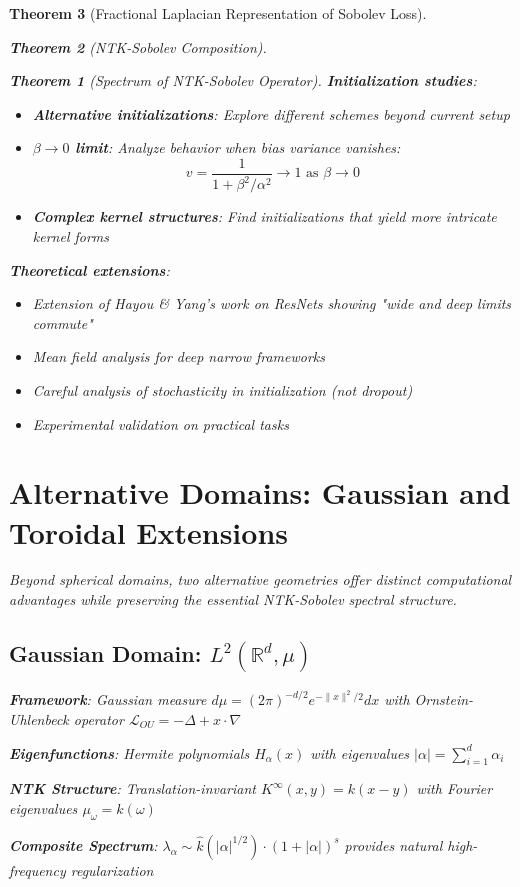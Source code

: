 \documentclass{article}
\newtheorem{theorem}{Theorem}[section]
\begin{document}
\begin{theorem}[Fractional Laplacian Representation of Sobolev Loss]
\begin{theorem}[NTK-Sobolev Composition]
\begin{theorem}[Spectrum of NTK-Sobolev Operator]
\textbf{Initialization studies}:
\begin{itemize}
\item \textbf{Alternative initializations}: Explore different schemes beyond current setup
\item \textbf{$\beta \to 0$ limit}: Analyze behavior when bias variance vanishes:
  \[ v = \frac{1}{1 + \beta^2/\alpha^2} \to 1 \text{ as } \beta \to 0 \]
\item \textbf{Complex kernel structures}: Find initializations that yield more intricate kernel forms
\end{itemize}

\textbf{Theoretical extensions}:
\begin{itemize}
\item Extension of Hayou \& Yang's work on ResNets showing "wide and deep limits commute"
\item Mean field analysis for deep narrow frameworks
\item Careful analysis of stochasticity in initialization (not dropout)
\item Experimental validation on practical tasks
\end{itemize}

\section{Alternative Domains: Gaussian and Toroidal Extensions}

Beyond spherical domains, two alternative geometries offer distinct computational advantages while preserving the essential NTK-Sobolev spectral structure.

\subsection{Gaussian Domain: $L^2(\mathbb{R}^d, \mu)$}

\textbf{Framework}: Gaussian measure $d\mu = (2\pi)^{-d/2} e^{-\|x\|^2/2} dx$ with Ornstein-Uhlenbeck operator $\mathcal{L}_{OU} = -\Delta + x \cdot \nabla$

\textbf{Eigenfunctions}: Hermite polynomials $H_{\alpha}(x)$ with eigenvalues $|\alpha| = \sum_{i=1}^d \alpha_i$

\textbf{NTK Structure}: Translation-invariant $K^{\infty}(x, y) = k(x - y)$ with Fourier eigenvalues $\mu_\omega = \hat{k}(\omega)$

\textbf{Composite Spectrum}: $\lambda_\alpha \sim \hat{k}(|\alpha|^{1/2}) \cdot (1 + |\alpha|)^s$ provides natural high-frequency regularization


\end{theorem}
\end{theorem}
\end{theorem}
\end{document}
